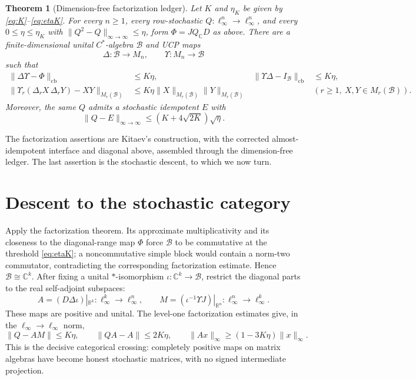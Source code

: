 \documentclass[10pt]{article}
\newtheorem{theorem}{Theorem}
\newcommand{\linf}{\ell_\infty}
\newcommand{\cb}{\mathrm{cb}}
\newcommand{\C}{\mathbb C}
\newcommand{\R}{\mathbb R}
\newcommand{\norm}[1]{\lVert #1\rVert}
\begin{document}
\begin{theorem}[Dimension-free factorization ledger]\label{thm:factor}
Let $K$ and $\eta_K$ be given by \eqref{eq:K}--\eqref{eq:etaK}.  For every
$n\geq1$, every row-stochastic $Q:\linf^n\to\linf^n$, and every
$0\leq\eta\leq\eta_K$ with
$\norm{Q^2-Q}_{\infty\to\infty}\leq\eta$, form $\Phi=JQ_{\C}D$ as above.
There are a finite-dimensional unital $C^*$-algebra $\mathcal B$ and UCP maps
\[
 \Delta:\mathcal B\to M_n,\qquad \Upsilon:M_n\to\mathcal B
\]
such that
\begin{align*}
 \norm{\Delta\Upsilon-\Phi}_{\cb}&\leq K\eta,&
 \norm{\Upsilon\Delta-I_{\mathcal B}}_{\cb}&\leq K\eta,\\
 \norm{\Upsilon_r(\Delta_rX\,\Delta_rY)-XY}_{M_r(\mathcal B)}
 &\leq K\eta\norm{X}_{M_r(\mathcal B)}\norm{Y}_{M_r(\mathcal B)}
 &&(r\geq1,\ X,Y\in M_r(\mathcal B)).
\end{align*}
Moreover, the same $Q$ admits a stochastic idempotent $E$ with
\[
 \norm{Q-E}_{\infty\to\infty}
 \leq (K+4\sqrt{2K})\sqrt\eta.
\]
\end{theorem}

The factorization assertions are Kitaev's construction, with the corrected
almost-idempotent interface and diagonal above, assembled through the
dimension-free ledger.  The last assertion is the stochastic descent, to
which we now turn.

\section{Descent to the stochastic category}

Apply the factorization theorem.  Its approximate multiplicativity and its
closeness to the diagonal-range map $\Phi$ force $\mathcal B$ to be
commutative at the threshold \eqref{eq:etaK}; a noncommutative simple block
would contain a norm-two commutator, contradicting the corresponding
factorization estimate.  Hence $\mathcal B\cong\C^k$.  After fixing a unital
$*$-isomorphism $\iota:\C^k\to\mathcal B$, restrict the diagonal parts to
the real self-adjoint subspaces:
\[
 A=(D\Delta\iota)|_{\R^k}:\linf^k\to\linf^n,\qquad
 M=(\iota^{-1}\Upsilon J)|_{\R^n}:\linf^n\to\linf^k.
\]
These maps are positive and unital.  The level-one factorization estimates
give, in the $\linf\!\to\!\linf$ norm,
\begin{equation}\label{eq:F2}
 \norm{Q-AM}\leq K\eta,\qquad
 \norm{QA-A}\leq2K\eta,\qquad
 \norm{Ax}_\infty\geq(1-3K\eta)\norm{x}_\infty.
\end{equation}
This is the decisive categorical crossing: completely positive maps on
matrix algebras have become honest stochastic matrices, with no signed
intermediate projection.
\end{document}
